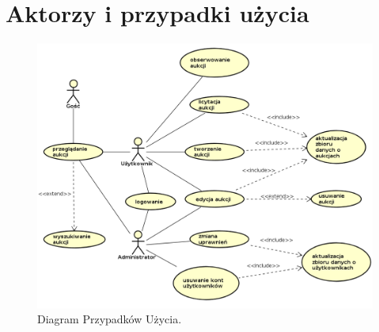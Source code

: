 \documentclass[brudnopis]{xmgr}
\begin{document}
\newpage

\section{Aktorzy i przypadki użycia}
\begin{figure}[!tbh]
\centering
\includegraphics[width=\linewidth]{fig/ucdiagram}
\caption{Diagram Przypadków Użycia.}
\end{figure}

\newpage
\end{document}
